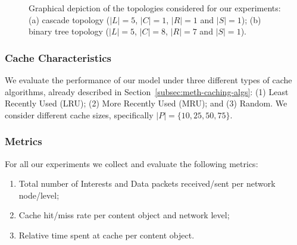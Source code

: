 \begin{figure}[h!]
    \centering


    \cprotect\caption{Graphical depiction of the topologies considered for 
        our experiments: (a) cascade topology ($|L| = 5$, $|C| = 1$, $|R| = 1$ 
        and $|S| = 1$); (b) binary tree topology 
        ($|L| = 5$, $|C| = 8$, $|R| = 7$ and $|S| = 1$).}
    \label{fig:exp-setup-nettop}

\end{figure}

\subsubsection{Cache Characteristics}
\label{subsec:exp-setup-cache}

We evaluate the performance of our model under three different types of cache 
algorithms, already described in Section~\ref{subsec:meth-caching-algs}: (1) 
Least Recently Used (LRU); (2) More Recently Used (MRU); and (3) Random. We 
consider different cache sizes, specifically $|P| = \{10, 25, 50, 75\}$.\shortvertbreak

\subsubsection{Metrics}
\label{subsec:exp-setup-metrics}

For all our experiments we collect and evaluate the following metrics:

\begin{enumerate}

    \item Total number of Interests and Data packets received\slash sent per network node\slash level;
    \item Cache hit\slash miss rate per content object and network level;
    \item Relative time spent at cache per content object.\shortvertbreak

\end{enumerate}

